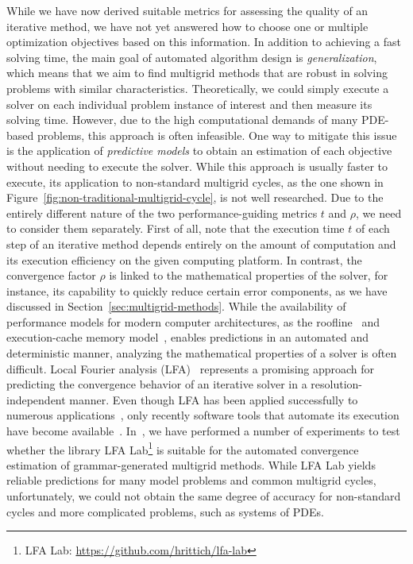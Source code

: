 While we have now derived suitable metrics for assessing the quality of an iterative method, we have not yet answered how to choose one or multiple optimization objectives based on this information.
In addition to achieving a fast solving time, the main goal of automated algorithm design is \emph{generalization}, which means that we aim to find multigrid methods that are robust in solving problems with similar characteristics.
Theoretically, we could simply execute a solver on each individual problem instance of interest and then measure its solving time.
However, due to the high computational demands of many PDE-based problems, this approach is often infeasible.
One way to mitigate this issue is the application of \emph{predictive models} to obtain an estimation of each objective without needing to execute the solver.
While this approach is usually faster to execute, its application to non-standard multigrid cycles, as the one shown in Figure~\ref{fig:non-traditional-multigrid-cycle}, is not well researched.
Due to the entirely different nature of the two performance-guiding metrics $t$ and $\rho$, we need to consider them separately.
First of all, note that the execution time $t$ of each step of an iterative method depends entirely on the amount of computation and its execution efficiency on the given computing platform.
In contrast, the convergence factor $\rho$ is linked to the mathematical properties of the solver, for instance, its capability to quickly reduce certain error components, as we have discussed in Section~\ref{sec:multigrid-methods}. 
While the availability of performance models for modern computer architectures, as the roofline~\cite{williams2009roofline} and execution-cache memory model~\cite{hager2016exploring}, enables predictions in an automated and deterministic manner, analyzing the mathematical properties of a solver is often difficult.
Local Fourier analysis (LFA)~\cite{wienands2004practical} represents a promising approach for predicting the convergence behavior of an iterative solver in a resolution-independent manner.
Even though LFA has been applied successfully to numerous applications~\cite{rodrigo2017validity}, only recently software tools that automate its execution have become available~\cite{rittich2018extending,kahl2020automated}.
In~\cite{schmitt2020constructing,hoefer2020comparing}, we have performed a number of experiments to test whether the library LFA Lab\footnote{LFA Lab: \url{https://github.com/hrittich/lfa-lab}} is suitable for the automated convergence estimation of grammar-generated multigrid methods.
While LFA Lab yields reliable predictions for many model problems and common multigrid cycles, unfortunately, we could not obtain the same degree of accuracy for non-standard cycles and more complicated problems, such as systems of PDEs.

